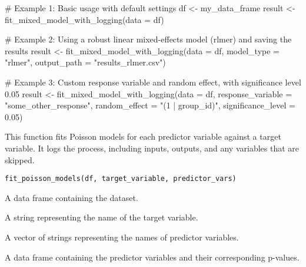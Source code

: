 \documentclass[a4paper]{book}
\begin{document}
\begin{Examples}
\begin{ExampleCode}
# Example 1: Basic usage with default settings
df <- my_data_frame
result <- fit_mixed_model_with_logging(data = df)

# Example 2: Using a robust linear mixed-effects model (rlmer) and saving the results
result <- fit_mixed_model_with_logging(data = df, model_type = "rlmer", output_path = "results_rlmer.csv")

# Example 3: Custom response variable and random effect, with significance level 0.05
result <- fit_mixed_model_with_logging(data = df,
                                       response_variable = "some_other_response",
                                       random_effect = "(1 | group_id)",
                                       significance_level = 0.05)

\end{ExampleCode}
\end{Examples}
%
\begin{Description}
This function fits Poisson models for each predictor variable against a target variable.
It logs the process, including inputs, outputs, and any variables that are skipped.
\end{Description}
%
\begin{Usage}
\begin{verbatim}
fit_poisson_models(df, target_variable, predictor_vars)
\end{verbatim}
\end{Usage}
%
\begin{Arguments}
\begin{ldescription}
\item[\code{df}] A data frame containing the dataset.

\item[\code{target\_variable}] A string representing the name of the target variable.

\item[\code{predictor\_vars}] A vector of strings representing the names of predictor variables.
\end{ldescription}
\end{Arguments}
%
\begin{Value}
A data frame containing the predictor variables and their corresponding p-values.
\end{Value}
\end{document}

